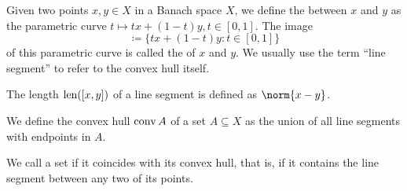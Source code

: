 \begin{definition}\label{def:convex_set}
  \hfill
  \begin{thmenum}
     Given two points \( x, y \in X \) in a Banach space \( X \), we define the  between \( x \) and \( y \) as the parametric curve \( t \mapsto tx + (1-t)y, t \in [0, 1] \). The image
    \begin{equation*}
      [x, y] \coloneqq \{ tx + (1-t)y \colon t \in [0, 1] \}
    \end{equation*}
    of this parametric curve is called the  of \( x \) and \( y \). We usually use the term \enquote{line segment} to refer to the convex hull itself.

    The length \( \operatorname{len}([x, y]) \) of a line segment is defined as \( \norm{x - y} \).

     We define the convex hull \( \operatorname{conv} A \) of a set \( A \subseteq X \) as the union of all line segments with endpoints in \( A \).

     We call a set  if it coincides with its convex hull, that is, if it contains the line segment between any two of its points.
  \end{thmenum}
\end{definition}

